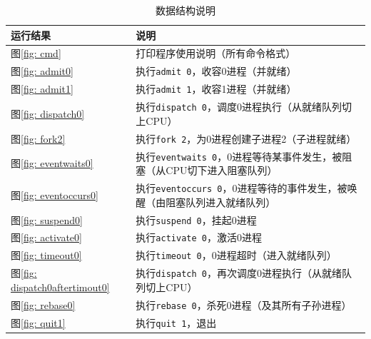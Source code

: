 \documentclass[11pt]{article}
\begin{document}
\begin{table}[htbp]
\centering  %
\begin{tabular}{ll}  %
\hline
运行结果 & 说明 \\
\hline
图\ref{fig: cmd} &  打印程序使用说明（所有命令格式）\\
图\ref{fig: admit0} &  执行\texttt{admit 0}，收容0进程（并就绪）\\
图\ref{fig: admit1} &  执行\texttt{admit 1}，收容1进程（并就绪）\\
图\ref{fig: dispatch0} &  执行\texttt{dispatch 0}，调度0进程执行（从就绪队列切上CPU）\\
图\ref{fig: fork2} &  执行\texttt{fork 2}，为0进程创建子进程2（子进程就绪）\\
图\ref{fig: eventwaits0} &  执行\texttt{eventwaits 0}，0进程等待某事件发生，被阻塞（从CPU切下进入阻塞队列）\\
图\ref{fig: eventoccurs0} &  执行\texttt{eventoccurs 0}，0进程等待的事件发生，被唤醒（由阻塞队列进入就绪队列）\\
图\ref{fig: suspend0} &  执行\texttt{suspend 0}，挂起0进程\\
图\ref{fig: activate0} &  执行\texttt{activate 0}，激活0进程\\
图\ref{fig: timeout0} &  执行\texttt{timeout 0}，0进程超时（进入就绪队列）\\
图\ref{fig: dispatch0aftertimout0} &  执行\texttt{dispatch 0}，再次调度0进程执行（从就绪队列切上CPU）\\
图\ref{fig: rebase0} &  执行\texttt{rebase 0}，杀死0进程（及其所有子孙进程）\\
图\ref{fig: quit1} &  执行\texttt{quit 1}，退出\\
\hline  %
\end{tabular}
\caption{数据结构说明\label{tab: data_structure}}
\end{table}
\end{document}

